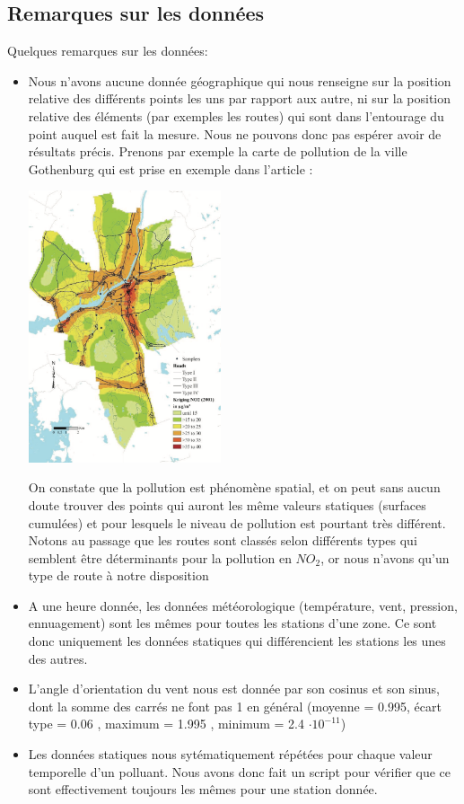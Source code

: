 \subsection{Remarques sur les données}
Quelques remarques sur les données:
\begin{itemize}
  \item
    Nous n'avons aucune donnée géographique qui nous renseigne sur la position relative des différents points les uns par rapport aux autre, ni sur la position relative des éléments (par exemples les routes) qui sont dans l'entourage du point auquel est fait la mesure.
    Nous ne pouvons donc pas espérer avoir de résultats précis.
    Prenons par exemple la carte de pollution de la ville Gothenburg qui est prise en exemple dans l'article \cite{}:
    \begin{center}
    \includegraphics[height=8cm]{images/pollution_gothenburg.png}
    \end{center}
    On constate que la pollution est phénomène spatial, et on peut sans aucun doute trouver des points qui auront les même valeurs statiques (surfaces cumulées) et pour lesquels le niveau de pollution est pourtant très différent.
    Notons au passage que les routes sont classés selon différents types qui semblent être déterminants pour la pollution en $NO_2$, or nous n'avons qu'un type de route à notre disposition
  \item
    A une heure donnée, les données météorologique (température, vent, pression, ennuagement) sont les mêmes pour toutes les stations d'une zone.
    Ce sont donc uniquement les données statiques qui différencient les stations les unes des autres.
  \item
    L'angle d'orientation du vent nous est donnée par son cosinus et son sinus, dont la somme des carrés ne font pas 1 en général (moyenne = 0.995, écart type =  0.06 , maximum =  1.995 , minimum = 2.4 $\cdot 10^{-11}$)
  \item
    Les données statiques nous sytématiquement répétées pour chaque valeur temporelle d'un polluant.
    Nous avons donc fait un script pour vérifier que ce sont effectivement toujours les mêmes pour une station donnée.
\end{itemize}

